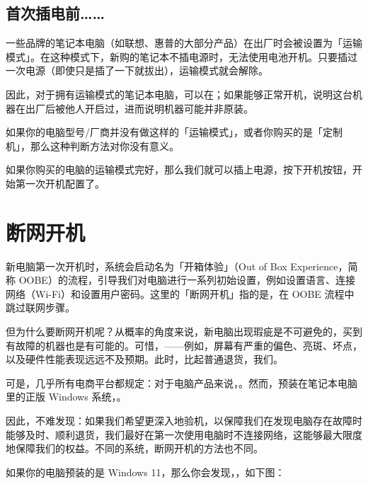 \subsection{首次插电前……}

一些品牌的笔记本电脑（如联想、惠普的大部分产品）在出厂时会被设置为「运输模式」。在这种模式下，新购的笔记本不插电源时，无法使用电池开机。只要插过一次电源（即使只是插了一下就拔出），运输模式就会解除。

因此，对于拥有运输模式的笔记本电脑，可以在；如果能够正常开机，说明这台机器在出厂后被他人开启过，进而说明机器可能并非原装。

\begin{note}
  如果你的电脑型号/厂商并没有做这样的「运输模式」，或者你购买的是「定制机」，那么这种判断方法对你没有意义。
\end{note}

如果你购买的电脑的运输模式完好，那么我们就可以插上电源，按下开机按钮，开始第一次开机配置了。

\section{断网开机}

新电脑第一次开机时，系统会启动名为「开箱体验」（Out of Box Experience，简称 OOBE）的流程，引导我们对电脑进行一系列初始设置，例如设置语言、连接网络（Wi-Fi）和设置用户密码。这里的「断网开机」指的是，在 OOBE 流程中跳过联网步骤。

但为什么要断网开机呢？从概率的角度来说，新电脑出现瑕疵是不可避免的，买到有故障的机器也是有可能的。可惜，——例如，屏幕有严重的偏色、亮斑、坏点，以及硬件性能表现远远不及预期。此时，比起普通退货，我们。

可是，几乎所有电商平台都规定：对于电脑产品来说，。然而，预装在笔记本电脑里的正版 Windows 系统，。

因此，不难发现：如果我们希望更深入地验机，以保障我们在发现电脑存在故障时能够及时、顺利退货，我们最好在第一次使用电脑时不连接网络，这能够最大限度地保障我们的权益。不同的系统，断网开机的方法也不同。

如果你的电脑预装的是 Windows 11，那么你会发现，，如下图：

